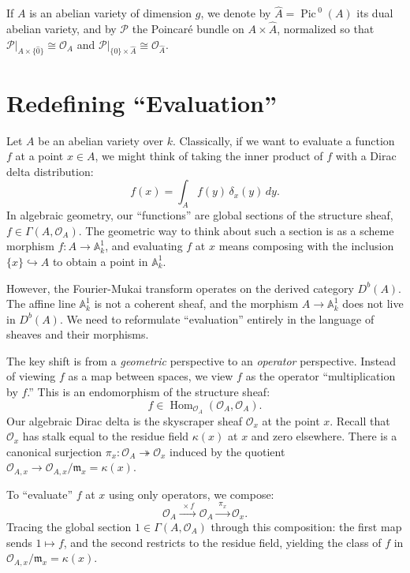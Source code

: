 \documentclass{article}
\newcommand{\A}{{\mathbb{A}}}
\newcommand{\CO}{{\mathcal{O}}}
\newcommand{\CP}{{\mathcal{P}}}
\newcommand{\fm}{{\mathfrak{m}}}
\newcommand{\Hom}{{\operatorname{Hom}}}
\newcommand{\Pic}{{\operatorname{Pic}\,}}
\begin{document}
If $A$ is an abelian variety of dimension $g$, we denote by $\hat{A} = \Pic^0(A)$ its dual abelian variety, and by $\CP$ the Poincar\'{e} bundle on $A \times \hat{A}$, normalized so that $\CP|_{A \times \{\hat{0}\}} \cong \CO_A$ and $\CP|_{\{0\} \times \hat{A}} \cong \CO_{\hat{A}}$.

\section{Redefining ``Evaluation''}

Let $A$ be an abelian variety over $k$. Classically, if we want to evaluate a function $f$ at a point $x \in A$, we might think of taking the inner product of $f$ with a Dirac delta distribution:
\[
    f(x) = \int_A f(y)\, \delta_x(y) \, dy.
\]
In algebraic geometry, our ``functions'' are global sections of the structure sheaf, $f \in \Gamma(A, \CO_A)$. The geometric way to think about such a section is as a scheme morphism $f\colon A \to \A_k^1$, and evaluating $f$ at $x$ means composing with the inclusion $\{x\} \hookrightarrow A$ to obtain a point in $\A_k^1$.

However, the Fourier-Mukai transform operates on the derived category $D^b(A)$. The affine line $\A_k^1$ is not a coherent sheaf, and the morphism $A \to \A_k^1$ does not live in $D^b(A)$. We need to reformulate ``evaluation'' entirely in the language of sheaves and their morphisms.

The key shift is from a \emph{geometric} perspective to an \emph{operator} perspective. Instead of viewing $f$ as a map between spaces, we view $f$ as the operator ``multiplication by $f$.'' This is an endomorphism of the structure sheaf:
\[
    f \in \Hom_{\CO_A}(\CO_A, \CO_A).
\]
Our algebraic Dirac delta is the skyscraper sheaf $\CO_x$ at the point $x$. Recall that $\CO_x$ has stalk equal to the residue field $\kappa(x)$ at $x$ and zero elsewhere. There is a canonical surjection $\pi_x\colon \CO_A \twoheadrightarrow \CO_x$ induced by the quotient $\CO_{A,x} \to \CO_{A,x}/\fm_x = \kappa(x)$.

To ``evaluate'' $f$ at $x$ using only operators, we compose:
\[
    \CO_A \xrightarrow{\;\times f\;} \CO_A \xrightarrow{\;\pi_x\;} \CO_x.
\]
Tracing the global section $1 \in \Gamma(A, \CO_A)$ through this composition: the first map sends $1 \mapsto f$, and the second restricts to the residue field, yielding the class of $f$ in $\CO_{A,x}/\fm_x = \kappa(x)$.
\end{document}
